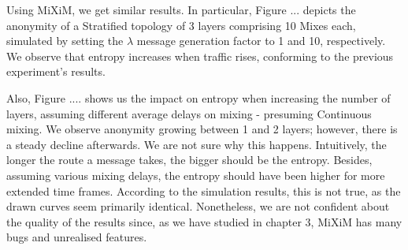 \documentclass[logo,msc,cyber]{infthesis}   %
\begin{document}
 Using MiXiM, we get similar results. In particular, Figure ... depicts the
 anonymity of a Stratified topology of 3 layers comprising 10 Mixes each,
 simulated by setting the $\lambda$ message generation factor to 1 and 10,
 respectively. We observe that entropy increases when traffic rises, conforming
 to the previous experiment's results.

 Also, Figure .... shows us the impact on entropy when increasing the number of
 layers, assuming different average delays on mixing - presuming Continuous
 mixing. We observe anonymity growing between 1 and 2 layers; however, there is
 a steady decline afterwards. We are not sure why this happens.
 Intuitively, the longer the route a message takes, the bigger should be the
 entropy. Besides, assuming various mixing delays, the entropy should have been
 higher for more extended time frames. According to the simulation results, this
 is not true, as the drawn curves seem primarily identical. Nonetheless, we are
 not confident about the quality of the results since, as we have studied in
 chapter 3, MiXiM has many bugs and unrealised features.
\end{document}
